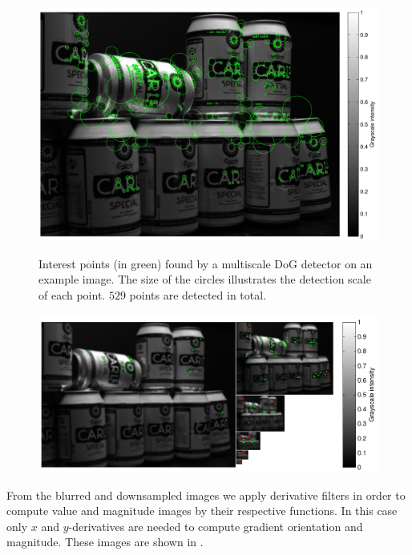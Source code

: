 \documentclass[thesis.tex]{subfiles}
\begin{document}
\begin{figure}[p]
    \centering
    \includegraphics[width=\textwidth]{img/cellHistDetector.pdf}
    \caption{Interest points (in green) found by a multiscale DoG detector on an example image. The size of the circles illustrates the detection scale of each point. $529$ points are detected in total.}
    \label{fig:cellHistDetector}
    \includegraphics[width=\textwidth]{img/cellHistScaleSpacesP.pdf}
    \caption{}
    \label{fig:cellHistScaleSpacesP}
\end{figure}

From the blurred and downsampled images we apply derivative filters in order to compute value and magnitude images by their respective functions. In this case only $x$ and $y$-derivatives are needed to compute gradient orientation and magnitude. These images are shown in .
\end{document}
